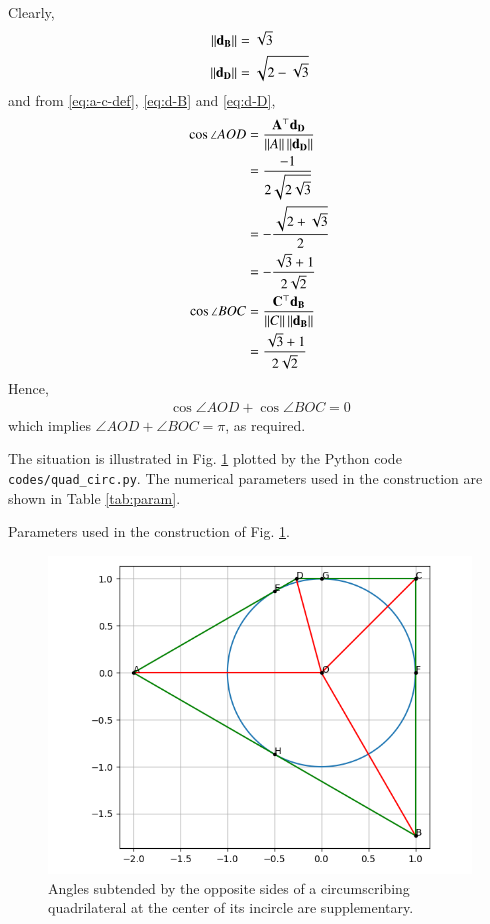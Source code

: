 \documentclass[journal,12pt,twocolumn]{IEEEtran}
\begin{document}
\begin{enumerate}
\begin{align}
    \end{align}
    Clearly,
    \begin{align}
        \left\lVert\mathbf{d_B}\right\rVert &= \sqrt{3} \\
        \left\lVert\mathbf{d_D}\right\rVert &= \sqrt{2-\sqrt{3}}
        \label{eq:norm-d}
    \end{align}
    and from \eqref{eq:a-c-def}, \eqref{eq:d-B} and \eqref{eq:d-D},
    \begin{align}
        \cos\angle AOD &= \frac{\mathbf{A}^\top\mathbf{d_D}}{\left\lVert A\right\rVert\left\lVert\mathbf{d_D}\right\rVert} \\
                       &= \frac{-1}{2\sqrt{2\sqrt{3}}} \\
                       &= -\frac{\sqrt{2+\sqrt{3}}}{2} \\
                       &= -\frac{\sqrt{3}+1}{2\sqrt{2}} \label{eq:cos-aod} \\
        \cos\angle BOC &= \frac{\mathbf{C}^\top\mathbf{d_B}}{\left\lVert C\right\rVert\left\lVert\mathbf{d_B}\right\rVert} \\
                       &= \frac{\sqrt{3}+1}{2\sqrt{2}} \label{eq:cos-boc}
    \end{align}
    Hence,
    \begin{align}
        \cos\angle AOD + \cos\angle BOC = 0
    \end{align}
    which implies $\angle AOD + \angle BOC = \pi$, as required.

    The situation is illustrated in Fig. \ref{fig:quad-circ} plotted by the 
    Python code \texttt{codes/quad\_circ.py}. The numerical parameters used 
    in the construction are shown in Table \ref{tab:param}.
    \begin{table}[!ht]
        \centering
        
        \caption{Parameters used in the construction of Fig. \ref{fig:quad-circ}.}
        \label{tab:param}
    \end{table}
    \begin{figure}[!ht]
        \centering
        \includegraphics[width=\columnwidth]{figs/quad_circ.png}
        \caption{Angles subtended by the opposite sides of a circumscribing quadrilateral at the center of its incircle are supplementary.}
        \label{fig:quad-circ}
    \end{figure}
\end{enumerate}
\end{document}
